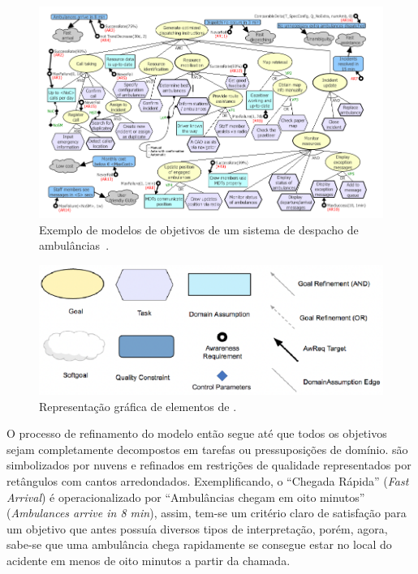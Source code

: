 \begin{figure}
	\centering
	\includegraphics[width=1\textwidth]{figuras/modelos/ACAD-Completo.png}
	\caption{Exemplo de modelos de objetivos de um sistema de despacho de ambulâncias~\cite{tesevitor}.}
	\label{figura-acad-completo}
\end{figure}

\begin{figure}
	\centering
	\includegraphics[width=1\textwidth]{figuras/modelos/Elementos-GORE.png}
	\caption{Representação gráfica de elementos de \gore.}
	\label{figura-elementos-gore-eca}
\end{figure}

O processo de refinamento do modelo então segue até que todos os objetivos sejam completamente decompostos em tarefas ou pressuposições de domínio. \sofgoals são simbolizados por nuvens e refinados em restrições de qualidade representados por retângulos com cantos arredondados. Exemplificando, o \sofgoal ``Chegada Rápida'' (\textit{Fast Arrival}) é operacionalizado por ``Ambulâncias chegam em oito minutos'' (\textit{Ambulances arrive in 8 min}), assim, tem-se um critério claro de satisfação para um objetivo que antes possuía diversos tipos de interpretação, porém, agora, sabe-se que uma ambulância chega rapidamente se consegue estar no local do acidente em menos de oito minutos a partir da chamada.

